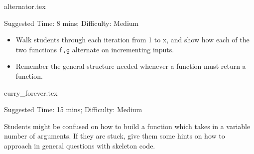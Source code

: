 \documentclass{exam}
\begin{document}
\begin{questions}
    {alternator.tex}
    \begin{questionmeta}
        Suggested Time: 8 mins; Difficulty: Medium
        \begin{itemize}
            \item Walk students through each iteration from 1 to x, and show how each of the two functions \verb|f,g| alternate on incrementing inputs.
            \item Remember the general structure needed whenever a function must return a function.
        \end{itemize}
    \end{questionmeta}

    {curry_forever.tex}
    \begin{questionmeta}
        Suggested Time: 15 mins; Difficulty: Medium
        \item Students might be confused on how to build a function which takes in a variable number of arguments. If they are stuck, give them some hints on how to approach in general questions with skeleton code.
    \end{questionmeta}
\end{questions}
\end{document}

